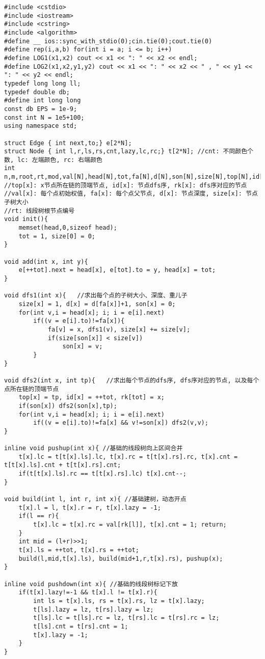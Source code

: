 \documentclass[twoside]{article}
\begin{document}
\begin{lstlisting}
#include <cstdio>
#include <iostream>
#include <cstring>
#include <algorithm>
#define __ ios::sync_with_stdio(0);cin.tie(0);cout.tie(0)
#define rep(i,a,b) for(int i = a; i <= b; i++)
#define LOG1(x1,x2) cout << x1 << ": " << x2 << endl;
#define LOG2(x1,x2,y1,y2) cout << x1 << ": " << x2 << " , " << y1 << ": " << y2 << endl;
typedef long long ll;
typedef double db;
#define int long long
const db EPS = 1e-9;
const int N = 1e5+100;
using namespace std;

struct Edge { int next,to;} e[2*N];
struct Node { int l,r,ls,rs,cnt,lazy,lc,rc;} t[2*N]; //cnt: 不同颜色个数, lc: 左端颜色, rc: 右端颜色
int n,m,root,rt,mod,val[N],head[N],tot,fa[N],d[N],son[N],size[N],top[N],id[N],rk[N];
//top[x]: x节点所在链的顶端节点, id[x]: 节点dfs序, rk[x]: dfs序对应的节点
//val[x]: 每个点初始权值, fa[x]: 每个点父节点, d[x]: 节点深度, size[x]: 节点子树大小
//rt: 线段树根节点编号
void init(){
	memset(head,0,sizeof head);
	tot = 1, size[0] = 0;
}

void add(int x, int y){
	e[++tot].next = head[x], e[tot].to = y, head[x] = tot;
}

void dfs1(int x){	//求出每个点的子树大小、深度、重儿子
	size[x] = 1, d[x] = d[fa[x]]+1, son[x] = 0;
	for(int v,i = head[x]; i; i = e[i].next)
		if((v = e[i].to)!=fa[x]){
			fa[v] = x, dfs1(v), size[x] += size[v];
			if(size[son[x]] < size[v])
				son[x] = v;
		}
}

void dfs2(int x, int tp){	//求出每个节点的dfs序, dfs序对应的节点, 以及每个点所在链的顶端节点
	top[x] = tp, id[x] = ++tot, rk[tot] = x;
	if(son[x]) dfs2(son[x],tp);
	for(int v,i = head[x]; i; i = e[i].next)
		if((v = e[i].to)!=fa[x] && v!=son[x]) dfs2(v,v);
}

inline void pushup(int x){ //基础的线段树向上区间合并
	t[x].lc = t[t[x].ls].lc, t[x].rc = t[t[x].rs].rc, t[x].cnt = t[t[x].ls].cnt + t[t[x].rs].cnt;
	if(t[t[x].ls].rc == t[t[x].rs].lc) t[x].cnt--;
}

void build(int l, int r, int x){ //基础建树，动态开点
	t[x].l = l, t[x].r = r, t[x].lazy = -1;
	if(l == r){
		t[x].lc = t[x].rc = val[rk[l]], t[x].cnt = 1; return;
	}
	int mid = (l+r)>>1;
	t[x].ls = ++tot, t[x].rs = ++tot;
	build(l,mid,t[x].ls), build(mid+1,r,t[x].rs), pushup(x);
}

inline void pushdown(int x){ //基础的线段树标记下放
	if(t[x].lazy!=-1 && t[x].l != t[x].r){
		int ls = t[x].ls, rs = t[x].rs, lz = t[x].lazy;
		t[ls].lazy = lz, t[rs].lazy = lz;
		t[ls].lc = t[ls].rc = lz, t[rs].lc = t[rs].rc = lz;
		t[ls].cnt = t[rs].cnt = 1;
		t[x].lazy = -1;
	}
}


\end{lstlisting}
\end{document}
